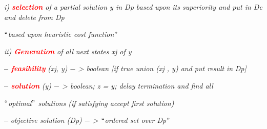\documentclass[12pt]{article}
\renewcommand{\_}{\kern-1.5pt\textunderscore\kern-1.5pt}
\begin{document}
\begin{adjustwidth}{0.98in}{0.03in}
\textit{i)  \textbf{\textcolor[HTML]{FF0000}{selection}} of a partial solution y in Dp based upon its superiority and put in Dc and delete from Dp}\par

\end{adjustwidth}

\begin{adjustwidth}{0.98in}{0.03in}
\begin{justify}
\textit{$``$based upon heuristic cost function$"$ }
\end{justify}\par

\end{adjustwidth}

\begin{adjustwidth}{1.26in}{-0.01in}
\textit{ii)  \textbf{\textcolor[HTML]{FF0000}{Generation}} of all} \textit{next states xj of y}\par

\end{adjustwidth}

\begin{adjustwidth}{0.83in}{-0.01in}
\textbf{–  \textit{\textcolor[HTML]{FF0000}{feasibility}}}\textit{ (xj, y) $-$  > boolean [if true union (xj , y) and put result} \textit{in} \textit{Dp]}\par

\end{adjustwidth}

\begin{adjustwidth}{0.83in}{-0.01in}
\textbf{–  \textit{\textcolor[HTML]{FF0000}{solution}}}\textit{ (y) $-$  > boolean;  z = y;  delay termination  and ﬁnd  all}\par

\end{adjustwidth}

\begin{adjustwidth}{0.98in}{0.61in}
\begin{justify}
\textit{$``$optimal$"$  solutions (if satisfying accept first solution)}
\end{justify}\par

\end{adjustwidth}

\begin{adjustwidth}{0.83in}{-0.01in}
\textbf{–  }\textit{objective solution (Dp) $-$  > $``$ordered set over Dp$"$ }\par

\end{adjustwidth}
\end{document}
